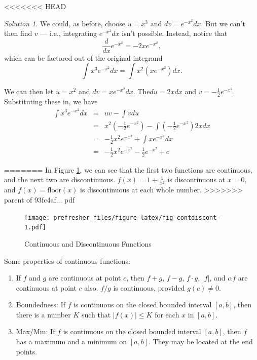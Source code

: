 \documentclass[]{book}
\providecommand{\tightlist}{%
  \setlength{\itemsep}{0pt}\setlength{\parskip}{0pt}}
\theoremstyle{definition}
\theoremstyle{definition}
\theoremstyle{definition}
\theoremstyle{remark}
\newtheorem*{solution}{Solution}
\begin{document}
<<<<<<< HEAD
\begin{solution}
{}We could, as before, choose \(u=x^3\) and \(dv=e^{-x^2}dx\). But we can't then find \(v\) --- i.e., integrating \(e^{-x^2}dx\) isn't possible. Instead, notice that \[\frac{d}{dx}e^{-x^2} = -2xe^{-x^2},\] which can be factored out of the original integrand \[\int x^3 e^{-x^2} dx = \int x^2 (xe^{-x^2})dx.\]

We can then let \(u=x^2\) and \(dv=x e^{-x^2}dx\). The\(du=2x dx\) and \(v=-\frac{1}{2}e^{-x^2}\). Substituting these in, we have
\begin{eqnarray}
                \int x^3 e^{-x^2} dx &=& u v - \int v du\nonumber\\
                &=& x^2 \left( -\frac{1}{2}e^{-x^2}\right) -\int \left(-\frac{1}{2}e^{-x^2}\right)2x dx\nonumber\\
                &=& -\frac{1}{2}x^2 e^{-x^2}+\int x e^{-x^2}dx\nonumber\\
                &=& -\frac{1}{2}x^2 e^{-x^2}-\frac{1}{2}e^{-x^2}+c\nonumber
\end{eqnarray}
\end{solution}
=======
{}In Figure \ref{fig:fig-contdiscont}, we can see that the first two functions are continuous, and the next two are discontinuous. \(f(x) = 1 + \frac{1}{x^2}\) is discontinuous at \(x= 0\), and \(f(x) = \text{floor}(x)\) is discontinuous at each whole number.
>>>>>>> parent of 93fc4af... pdf

\begin{figure}
\centering
\texttt{[image: prefresher\_files/figure-latex/fig-contdiscont-1.pdf]}
\caption{\label{fig:fig-contdiscont}Continuous and Discontinuous Functions}
\end{figure}

Some properties of continuous functions:

\begin{enumerate}
\def\labelenumi{\arabic{enumi}.}
\tightlist
\item
  If \(f\) and \(g\) are continuous at point \(c\), then \(f+g\), \(f-g\), \(f \cdot g\), \(|f|\), and \(\alpha f\) are continuous at point \(c\) also. \(f/g\) is continuous, provided \(g(c)\ne 0\).
\item
  Boundedness: If \(f\) is continuous on the closed bounded interval \([a,b]\), then there is a number \(K\) such that \(|f(x)|\le K\) for each \(x\) in \([a,b]\).
\item
  Max/Min: If \(f\) is continuous on the closed bounded interval \([a,b]\), then \(f\) has a maximum and a minimum on \([a,b]\). They may be located at the end points.
\end{enumerate}
\end{document}
